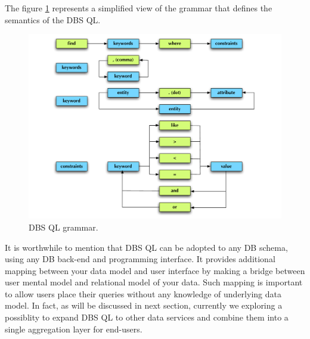 \documentclass[a4paper]{jpconf}
\begin{document}
The figure \ref{Grammar} represents a simplified view of the grammar
that defines the semantics of the DBS QL.
\begin{figure}[htb]
\centering
\includegraphics[width=150mm]{DBSSql_grammar.pdf}
\caption{
DBS QL grammar.
}
\label{Grammar}
\end{figure}
It is worthwhile to mention that DBS QL can be adopted to
any DB schema, using any DB back-end and programming interface.
It provides additional mapping between your data model and
user interface by making a bridge between user mental model
and relational model of your data. Such mapping is important
to allow users place their queries without any knowledge of
underlying data model. 
In fact, as will be discussed in
next section, currently we exploring a possiblity to
expand DBS QL to other data services and combine them
into a single aggregation layer for end-users.
\end{document}
